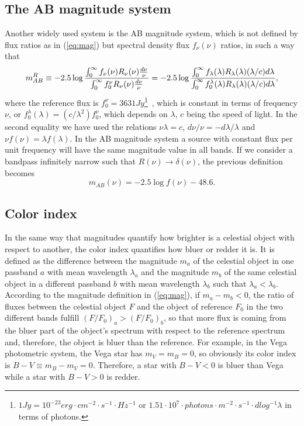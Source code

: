 \subsection{The AB magnitude system}
Another widely used system is the AB magnitude system, which is not defined by flux ratios as in (\ref{eq:mag}) but spectral density flux $f_\nu(\nu)$ ratios, in such a way that
\begin{equation}
m^R_{AB} \equiv -2.5\log{ \int^{\infty}_0 f_\nu(\nu)R_\nu(\nu){d\nu \over \nu} \over \int^{\infty}_0 f^\nu_0 R_\nu(\nu) {d\nu \over \nu}} = -2.5\log{ \int^{\infty}_0 f_\lambda(\lambda)R_\lambda (\lambda)  (\lambda / c) d\lambda \over \int^{\infty}_0 f^\lambda_0 (\lambda) R_\lambda (\lambda) (\lambda / c) d\lambda},
\label{eq:magAB}
\end{equation}
where the reference flux is $f^\nu_0=3631Jy$\footnote{$1Jy = 10^{-23}erg \cdot cm^{-2} \cdot s^{-1} \cdot Hz^{-1}$  or $1.51 \cdot 10^7 \cdot photons \cdot m^{-2} \cdot s^{-1} \cdot dlog^{-1}\lambda$ in terms of photons.}~\citep{Oke1983}, which is constant in terms of frequency $\nu$, or $f^\lambda_0 (\lambda) = (c/\lambda^2) f^\nu_0$, which depends on $\lambda$, $c$ being the speed of light. In the second equality we have used the relations $\nu \lambda =c$, $d\nu / \nu = -d\lambda / \lambda$ and $\nu f(\nu) = \lambda f(\lambda)$. In the AB magnitude system a source with constant flux per unit frequency will have the same magnitude value in all bands. If we consider a bandpass infinitely narrow such that $R(\nu) \rightarrow \delta(\nu)$, the previous definition becomes
\begin{equation}
m_{AB}(\nu) = -2.5 \log f(\nu) - 48.6.
\end{equation}

\subsection{Color index}
In the same way that magnitudes quantify how brighter is a celestial object with respect to another, the color index quantifies how bluer or redder it is. It is defined as the difference between the magnitude $m_a$ of the celestial object in one passband $a$ with mean wavelength $\lambda_a$ and the magnitude $m_b$ of the same celestial object in a different passband $b$ with mean wavelength $\lambda_b$ such that $\lambda_a<\lambda_b$. According to the magnitude definition in (\ref{eq:mag}), if $m_a-m_b<0$, the ratio of fluxes between the celestial object $F$ and the object of reference $F_0$ in the two different bands fulfill $(F/F_0)_a>(F/F_0)_b$, so that more flux is coming from the bluer part of the object's spectrum with respect to the reference spectrum and, therefore, the object is bluer than the reference. For example, in the Vega photometric system, the Vega star has $m_V = m_B = 0$, so obviously its color index is $B-V \equiv m_B-m_V = 0$. Therefore, a star with $B-V<0$ is bluer than Vega while a star with $B-V>0$ is redder. 

